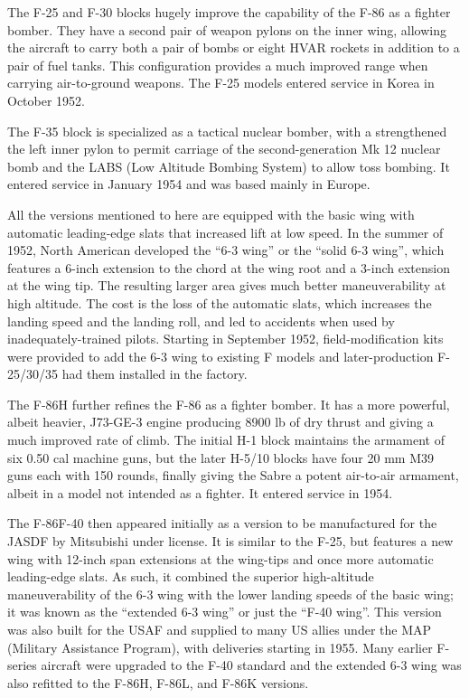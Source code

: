 The F-25 and F-30 blocks hugely improve the capability of the F-86 as a fighter bomber. They have a second pair of weapon pylons on the inner wing, allowing the aircraft to carry both a pair of bombs or eight HVAR rockets in addition to a pair of fuel tanks. This configuration provides a much improved range when carrying air-to-ground weapons. The F-25 models entered service in Korea in October 1952. 

The F-35 block is specialized as a tactical nuclear bomber, with a strengthened the left inner pylon to permit carriage of the second-generation Mk 12 nuclear bomb and the LABS (Low Altitude Bombing System) to allow toss bombing. It entered service in January 1954 and was based mainly in Europe.

All the versions mentioned to here are equipped with the basic wing with automatic leading-edge slats that increased lift at low speed. In the summer of 1952, North American developed the “6-3 wing” or the “solid 6-3 wing”, which features a 6-inch extension to the chord at the wing root and a 3-inch extension at the wing tip. The resulting larger area gives much better maneuverability at high altitude. The cost is the loss of the automatic slats, which increases the landing speed and the landing roll, and led to accidents when used by inadequately-trained pilots. Starting in September 1952, field-modification kits were provided to add the 6-3 wing to existing F models and later-production F-25/30/35 had them installed in the factory.

The F-86H further refines the F-86 as a fighter bomber. It has a more powerful, albeit heavier, J73-GE-3 engine producing 8900 lb of dry thrust and giving a much improved rate of climb. The initial H-1 block maintains the armament of six 0.50 cal machine guns, but the later H-5/10 blocks have four 20 mm M39 guns each with 150 rounds, finally giving the Sabre a potent air-to-air armament, albeit in a model not intended as a fighter. It entered service in 1954.

The F-86F-40 then appeared initially as a version to be manufactured for the JASDF by Mitsubishi under license. It is similar to the F-25, but features a new wing with 12-inch span extensions at the wing-tips and once more automatic leading-edge slats. As such, it combined the superior high-altitude maneuverability of the 6-3 wing with the lower landing speeds of the basic wing; it was known as the “extended 6-3 wing” or just the “F-40 wing”. This version was also built for the USAF and supplied to many US allies under the MAP (Military Assistance Program), with deliveries starting in 1955. Many earlier F-series aircraft were upgraded to the F-40 standard and the extended 6-3 wing was also refitted to the F-86H, F-86L, and F-86K versions.

